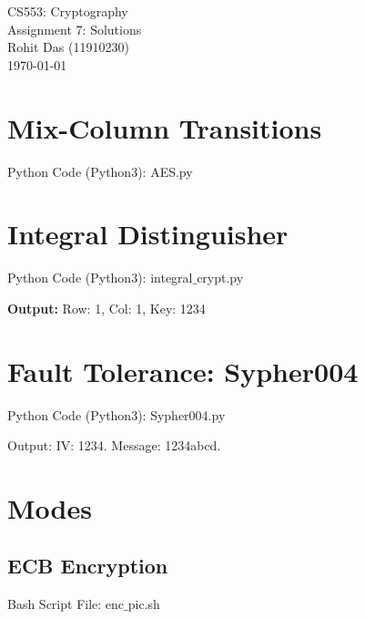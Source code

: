 \documentclass[12pt]{article}
\begin{document}
\begin{titlepage}
\centering
\vspace*{\fill}
\huge CS553: Cryptography\\
\LARGE Assignment 7: Solutions\\
\Large Rohit Das (11910230)\\\vspace{0.8cm}
\today
\vspace*{\fill}
\end{titlepage}

\section{Mix-Column Transitions}

Python Code (Python3): AES.py

\vspace{0.05cm}

\newpage
\section{Integral Distinguisher}

Python Code (Python3): integral$\_$crypt.py

\vspace{0.05cm}
\textbf{Output:}
Row: 1, Col: 1, Key: 1234


\newpage
\section{Fault Tolerance: Sypher004}

Python Code (Python3): Sypher004.py

\vspace{0.05cm}
Output:
IV: 1234. Message: 1234abcd.

\vspace{0.05cm}

\newpage
\section{Modes}

\subsection{ECB Encryption}
Bash Script File: enc$\_$pic.sh

\vspace{0.05cm}
\end{document}
